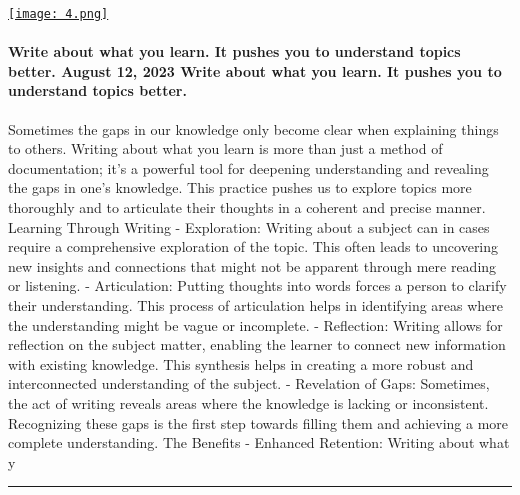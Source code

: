 \documentclass[10pt,a4paper]{article}
\begin{document}
\begin{minipage}[t]{0.80\linewidth}
\vspace{0pt}
\begin{multicols}{2}

    \href{https://addyosmani.com/blog/write-learn/?utm\_source=hackernewsletter\&utm\_medium=email\&utm\_term=fav}{
        \texttt{[image: 4.png]}
    }
  
\paragraph{Write about what you learn. It pushes you to understand topics better.
August 12, 2023
Write about what you learn. It pushes you to understand topics better.}
 Sometimes the gaps in our knowledge only become clear when explaining things to others.
Writing about what you learn is more than just a method of documentation; it's a powerful tool for deepening understanding and revealing the gaps in one's knowledge. This practice pushes us to explore topics more thoroughly and to articulate their thoughts in a coherent and precise manner.
Learning Through Writing
- Exploration: Writing about a subject can in cases require a comprehensive exploration of the topic. This often leads to uncovering new insights and connections that might not be apparent through mere reading or listening.
- Articulation: Putting thoughts into words forces a person to clarify their understanding. This process of articulation helps in identifying areas where the understanding might be vague or incomplete.
- Reflection: Writing allows for reflection on the subject matter, enabling the learner to connect new information with existing knowledge. This synthesis helps in creating a more robust and interconnected understanding of the subject.
- Revelation of Gaps: Sometimes, the act of writing reveals areas where the knowledge is lacking or inconsistent. Recognizing these gaps is the first step towards filling them and achieving a more complete understanding.
The Benefits
- Enhanced Retention: Writing about what y

\end{multicols}
\end{minipage}
\par\medskip
\noindent\textcolor{red}{\rule{\linewidth}{0.2mm}}
\end{document}
